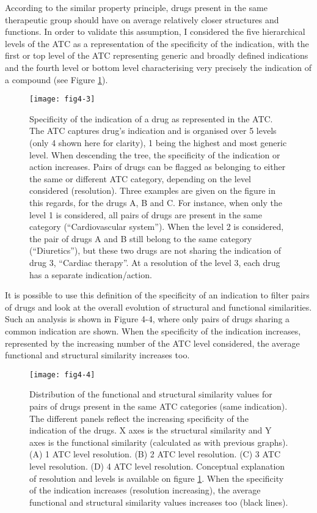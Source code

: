 According to the similar property principle, drugs present in the same therapeutic group should have on average relatively closer structures and functions. In order to validate this assumption, I considered the five hierarchical levels of the ATC as a representation of the specificity of the indication, with the first or top level of the ATC representing generic and broadly defined indications and the fourth level or bottom level characterising very precisely the indication of a compound (see Figure \ref{fig4-3}).

\begin{figure}[H]
    \centering
    \texttt{[image: fig4-3]}
    \caption{Specificity of the indication of a drug as represented in the ATC. The ATC captures drug’s indication and is organised over 5 levels (only 4 shown here for clarity), 1 being the highest and most generic level. When descending the tree, the specificity of the indication or action increases. Pairs of drugs can be flagged as belonging to either the same or different ATC category, depending on the level considered (resolution). Three examples are given on the figure in this regards, for the drugs A, B and C. For instance, when only the level 1 is considered, all pairs of drugs are present in the same category (“Cardiovascular system”). When the level 2 is considered, the pair of drugs A and B still belong to the same category (“Diuretics”), but these two drugs are not sharing the indication of drug 3, “Cardiac therapy”. At a resolution of the level 3, each drug has a separate indication/action.}
    \label{fig4-3}
\end{figure}

It is possible to use this definition of the specificity of an indication to filter pairs of drugs and look at the overall evolution of structural and functional similarities. Such an analysis is shown in Figure 4-4, where only pairs of drugs sharing a common indication are shown. When the specificity of the indication increases, represented by the increasing number of the ATC level considered, the average functional and structural similarity increases too.

\begin{figure}[H]
    \centering
    \texttt{[image: fig4-4]}
    \caption{Distribution of the functional and structural similarity values for pairs of drugs present in the same ATC categories (same indication). The different panels reflect the increasing specificity of the indication of the drugs. X axes is the structural similarity and Y axes is the functional similarity (calculated as with previous graphs). (A) 1 ATC level resolution. (B) 2 ATC level resolution. (C) 3 ATC level resolution. (D) 4 ATC level resolution. Conceptual explanation of resolution and levels is available on figure \ref{fig4-3}. When the specificity of the indication increases (resolution increasing), the average functional and structural similarity values increases too (black lines).}
    \label{fig4-4}
\end{figure}

